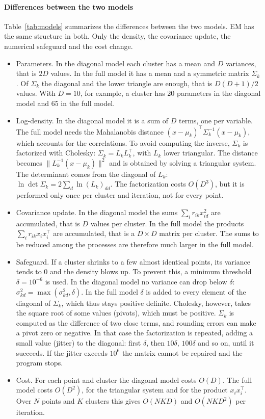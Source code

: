 \documentclass[conference,onecolumn]{IEEEtran}
\begin{document}
\paragraph{Differences between the two models} Table~\ref{tab:models} summarizes the differences between the two models. EM has the same structure in both. Only the density, the covariance update, the numerical safeguard and the cost change.
\begin{itemize}
\item Parameters. In the diagonal model each cluster has a mean and $D$ variances, that is $2D$ values. In the full model it has a mean and a symmetric matrix $\Sigma_k$. Of $\Sigma_k$ the diagonal and the lower triangle are enough, that is $D(D+1)/2$ values. With $D=10$, for example, a cluster has 20 parameters in the diagonal model and 65 in the full model.
\item Log-density. In the diagonal model it is a sum of $D$ terms, one per variable. The full model needs the Mahalanobis distance $(x-\mu_k)^\top\Sigma_k^{-1}(x-\mu_k)$, which accounts for the correlations. To avoid computing the inverse, $\Sigma_k$ is factorized with Cholesky: $\Sigma_k=L_kL_k^\top$, with $L_k$ lower triangular. The distance becomes $\|L_k^{-1}(x-\mu_k)\|^2$ and is obtained by solving a triangular system. The determinant comes from the diagonal of $L_k$: $\ln\det\Sigma_k=2\sum_d\ln(L_k)_{dd}$. The factorization costs $O(D^3)$, but it is performed only once per cluster and iteration, not for every point.
\item Covariance update. In the diagonal model the sums $\sum_i r_{ik}x_{id}^2$ are accumulated, that is $D$ values per cluster. In the full model the products $\sum_i r_{ik}x_ix_i^\top$ are accumulated, that is a $D\times D$ matrix per cluster. The sums to be reduced among the processes are therefore much larger in the full model.
\item Safeguard. If a cluster shrinks to a few almost identical points, its variance tends to 0 and the density blows up. To prevent this, a minimum threshold $\delta=10^{-6}$ is used. In the diagonal model no variance can drop below $\delta$: $\sigma^2_{kd}=\max(\sigma^2_{kd},\delta)$. In the full model $\delta$ is added to every element of the diagonal of $\Sigma_k$, which thus stays positive definite. Cholesky, however, takes the square root of some values (pivots), which must be positive. $\Sigma_k$ is computed as the difference of two close terms, and rounding errors can make a pivot zero or negative. In that case the factorization is repeated, adding a small value (jitter) to the diagonal: first $\delta$, then $10\delta$, $100\delta$ and so on, until it succeeds. If the jitter exceeds $10^6$ the matrix cannot be repaired and the program stops.
\item Cost. For each point and cluster the diagonal model costs $O(D)$. The full model costs $O(D^2)$, for the triangular system and for the product $x_ix_i^\top$. Over $N$ points and $K$ clusters this gives $O(NKD)$ and $O(NKD^2)$ per iteration.
\end{itemize}
\end{document}
